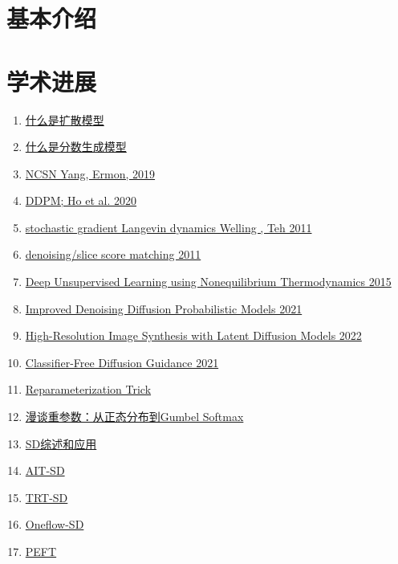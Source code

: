 \section{基本介绍}



\section{学术进展}
\begin{enumerate}
  \item \href{https://lilianweng.github.io/posts/2021-07-11-diffusion-models/}{什么是扩散模型}
  \item \href{http://yang-song.net/blog/2021/score/}{什么是分数生成模型}
  \item \href{https://arxiv.org/abs/1907.05600}{NCSN Yang, Ermon, 2019}
  \item \href{https://arxiv.org/abs/2006.11239}{DDPM; Ho et al. 2020}
  \item \href{https://www.stats.ox.ac.uk/~teh/research/compstats/WelTeh2011a.pdf}{stochastic gradient Langevin dynamics Welling , Teh 2011}
  \item \href{http://www.iro.umontreal.ca/~vincentp/Publications/smdae_techreport.pdf}{denoising/slice score matching 2011}
  \item \href{https://arxiv.org/abs/1503.03585}{Deep Unsupervised Learning using Nonequilibrium Thermodynamics 2015}
  \item \href{https://arxiv.org/abs/2102.09672}{Improved Denoising Diffusion Probabilistic Models 2021}
  \item \href{https://arxiv.org/abs/2112.10752}{High-Resolution Image Synthesis with Latent Diffusion Models 2022}
  \item \href{https://openreview.net/forum?id=qw8AKxfYbI}{Classifier-Free Diffusion Guidance 2021}
  \item \href{https://sassafras13.github.io/ReparamTrick/}{Reparameterization Trick}
  \item \href{https://kexue.fm/archives/6705}{漫谈重参数：从正态分布到Gumbel Softmax}
  \item \href{https://github.com/YangLing0818/Diffusion-Models-Papers-Survey-Taxonomy}{SD综述和应用}
  \item \href{https://github.com/facebookincubator/AITemplate/tree/main/examples/05_stable_diffusion}{AIT-SD}
  \item \href{https://github.com/NVIDIA/TensorRT/tree/release/8.6/demo/Diffusion}{TRT-SD}
  \item \href{https://github.com/Oneflow-Inc/diffusers}{Oneflow-SD}
  \item \href{https://github.com/huggingface/peft}{PEFT}
\end{enumerate}

